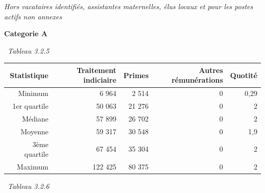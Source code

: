 \emph{Hors vacataires identifiés, assistantes maternelles, élus locaux
et pour les postes actifs non annexes}

\textbf{Categorie A}

~\emph{Tableau 3.2.5}

\begin{longtable}[]{@{}rrrrr@{}}
\toprule
Statistique & Traitement indiciaire & Primes & Autres rémunérations &
Quotité\tabularnewline
\midrule
\endhead
Minimum & 6 964 & 2 514 & 0 & 0,29\tabularnewline
1er quartile & 50 063 & 21 276 & 0 & 2\tabularnewline
Médiane & 57 899 & 26 702 & 0 & 2\tabularnewline
Moyenne & 59 317 & 30 548 & 0 & 1,9\tabularnewline
3ème quartile & 67 454 & 35 304 & 0 & 2\tabularnewline
Maximum & 122 425 & 80 375 & 0 & 2\tabularnewline
\bottomrule
\end{longtable}

~\emph{Tableau 3.2.6}


